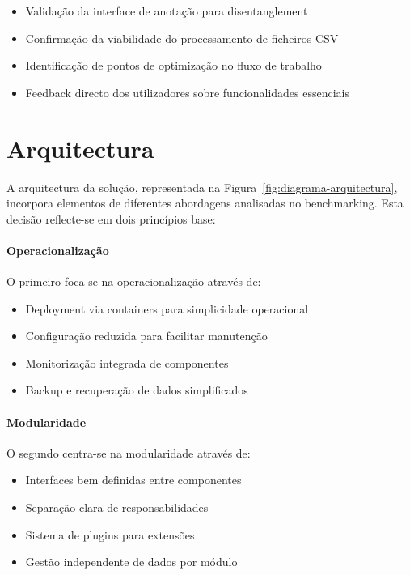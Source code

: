 \begin{itemize}
    \item Validação da interface de anotação para disentanglement
    \item Confirmação da viabilidade do processamento de ficheiros CSV
    \item Identificação de pontos de optimização no fluxo de trabalho
    \item Feedback directo dos utilizadores sobre funcionalidades essenciais
\end{itemize}

\section{Arquitectura}

A arquitectura da solução, representada na Figura~\ref{fig:diagrama-arquitectura}, incorpora elementos de diferentes abordagens analisadas no benchmarking. Esta decisão reflecte-se em dois princípios base:

\paragraph{Operacionalização}
O primeiro foca-se na operacionalização através de:

\begin{itemize}
    \item Deployment via containers para simplicidade operacional
    \item Configuração reduzida para facilitar manutenção
    \item Monitorização integrada de componentes
    \item Backup e recuperação de dados simplificados
\end{itemize}

\paragraph{Modularidade}
O segundo centra-se na modularidade através de:

\begin{itemize}
    \item Interfaces bem definidas entre componentes
    \item Separação clara de responsabilidades
    \item Sistema de plugins para extensões
    \item Gestão independente de dados por módulo
\end{itemize}

